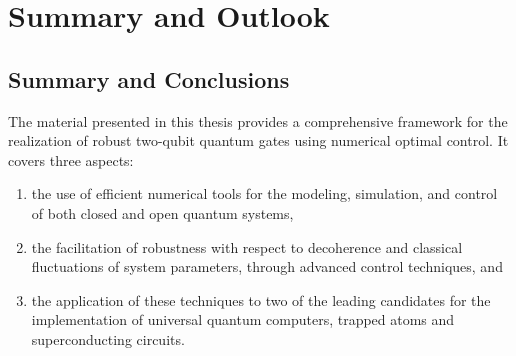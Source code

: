 \chapter{Summary and Outlook}
\label{chap:outlook}

\section{Summary and Conclusions}

The material presented in this thesis provides a comprehensive framework for the
realization of robust two-qubit quantum gates using numerical optimal control.
It covers three aspects:
\begin{enumerate}[noitemsep]
  \item the use of efficient numerical tools for the modeling, simulation, and
        control of both closed and open quantum systems,
  \item the facilitation of robustness with respect to decoherence and classical
        fluctuations of system parameters, through advanced control techniques,
        and
  \item the application of these techniques to two of the leading candidates for
        the implementation of universal quantum computers, trapped atoms and
        superconducting circuits.
\end{enumerate}

